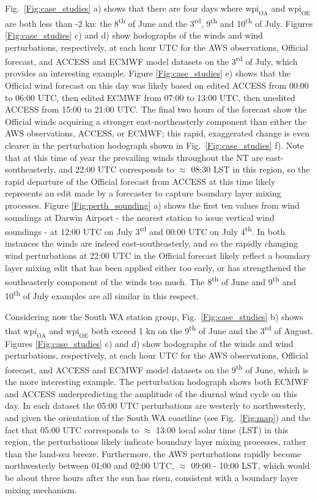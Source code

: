 \documentclass{ametsoc}
\begin{document}
Fig.~\ref{Fig:case_studies} a) shows that there are four days where $\text{wpi}_\text{OA}$ and $\text{wpi}_\text{OE}$ are both less than -2 kn: the 8\textsuperscript{th} of June and the 3\textsuperscript{rd}, 9\textsuperscript{th} and 10\textsuperscript{th} of July. Figures \ref{Fig:case_studies} c) and d) show hodographs of the winds and wind perturbations, respectively, at each hour UTC for the AWS observations, Official forecast, and ACCESS and ECMWF model datasets on the 3\textsuperscript{rd} of July, which provides an interesting example. Figure \ref{Fig:case_studies} e) shows that the Official wind forecast on this day was likely based on edited ACCESS from 00:00 to 06:00 UTC, then edited ECMWF from 07:00 to 13:00 UTC, then unedited ACCESS from 15:00 to 21:00 UTC. The final two hours of the forecast show the Official winds acquiring a stronger east-northeasterly component than either the AWS observations, ACCESS, or ECMWF; this rapid, exaggerated change is even clearer in the perturbation hodograph shown in Fig.~\ref{Fig:case_studies} f). Note that at this time of year the prevailing winds throughout the NT are east-southeasterly, and 22:00 UTC corresponds to $\approx$ 08:30 LST in this region, so the rapid departure of the Official forecast from ACCESS at this time likely represents an edit made by a forecaster to capture boundary layer mixing processes. Figure \ref{Fig:perth_sounding} a) shows the first ten values from wind soundings at Darwin Airport - the nearest station to issue vertical wind soundings - at 12:00 UTC on July 3\textsuperscript{rd} and 00:00 UTC on July 4\textsuperscript{th}. In both instances the winds are indeed east-southeasterly, and so the rapidly changing wind perturbations at 22:00 UTC in the Official forecast likely reflect a boundary layer mixing edit that has been applied either too early, or has strengthened the southeasterly component of the winds too much. The 8\textsuperscript{th} of June and 9\textsuperscript{th} and 10\textsuperscript{th} of July examples are all similar in this respect.              

Considering now the South WA station group, Fig.~\ref{Fig:case_studies} b) shows that $\text{wpi}_\text{OA}$ and $\text{wpi}_\text{OE}$ both exceed 1 kn on the 9\textsuperscript{th} of June and the 3\textsuperscript{rd} of August. Figures \ref{Fig:case_studies} c) and d) show hodographs of the winds and wind perturbations, respectively, at each hour UTC for the AWS observations, Official forecast, and ACCESS and ECMWF model datasets on the 9\textsuperscript{th} of June, which is the more interesting example. The perturbation hodograph shows both ECMWF and ACCESS underpredicting the amplitude of the diurnal wind cycle on this day. In each dataset the 05:00 UTC perturbations are westerly to northwesterly, and given the orientation of the South WA coastline (see Fig.~\ref{Fig:map}) and the fact that 05:00 UTC corresponds to $\approx$ 13:00 local solar time (LST) in this region, the perturbations likely indicate boundary layer mixing processes, rather than the land-sea breeze. Furthermore, the AWS perturbations rapidly become northwesterly between 01:00 and 02:00 UTC, $\approx$ 09:00 - 10:00 LST, which would be about three hours after the sun has risen, consistent with a boundary layer mixing mechanism. 
\end{document}
